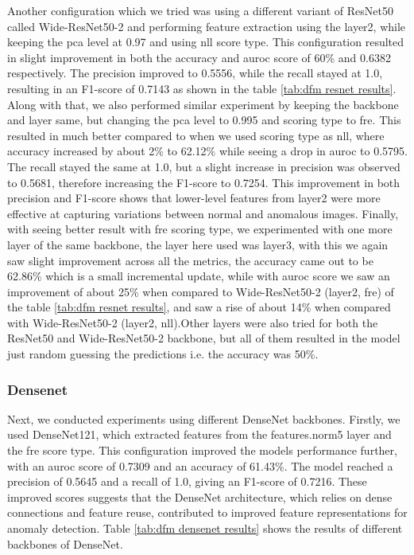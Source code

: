 Another configuration which we tried was using a different variant of ResNet50 called Wide-ResNet50-2 and performing feature extraction using the layer2, while keeping the \gls{pca} level at 0.97 and using \gls{nll} score type. This configuration resulted in slight improvement in both the accuracy and \gls{auroc} score of 60\% and 0.6382 respectively. The precision improved to 0.5556, while the recall stayed at 1.0, resulting in an F1-score of 0.7143 as shown in the table \ref{tab:dfm resnet results}. Along with that, we also performed similar experiment by keeping the backbone and layer same, but changing the \gls{pca} level to 0.995 and scoring type to \gls{fre}. This resulted in much better compared to when we used scoring type as \gls{nll}, where accuracy increased by about 2\% to 62.12\% while seeing a drop in \gls{auroc} to 0.5795. The recall stayed the same at 1.0, but a slight increase in precision was observed to 0.5681, therefore increasing the F1-score to 0.7254. This improvement in both precision and F1-score shows that lower-level features from layer2 were more effective at capturing variations between normal and anomalous images. Finally, with seeing better result with \gls{fre} scoring type, we experimented with one more layer of the same backbone, the layer here used was layer3, with this we again saw slight improvement across all the metrics, the accuracy came out to be 62.86\% which is a small incremental update, while with \gls{auroc} score we saw an improvement of about 25\% when compared to Wide-ResNet50-2 (layer2, \gls{fre}) of the table \ref{tab:dfm resnet results}, and saw a rise of about 14\% when compared with Wide-ResNet50-2 (layer2, \gls{nll}).Other layers were also tried for both the ResNet50 and Wide-ResNet50-2 backbone, but all of them resulted in the model just random guessing the predictions i.e. the accuracy was 50\%.

\subsubsection*{Densenet}

Next, we conducted experiments using different DenseNet backbones. Firstly, we used DenseNet121, which extracted features from the features.norm5 layer and the \gls{fre} score type. This configuration improved the models performance further, with an \gls{auroc} score of 0.7309 and an accuracy of 61.43\%. The model reached a precision of 0.5645 and a recall of 1.0, giving an F1-score of 0.7216. These improved scores suggests that the DenseNet architecture, which relies on dense connections and feature reuse, contributed to improved feature representations for anomaly detection. Table \ref{tab:dfm densenet results} shows the results of different backbones of DenseNet.

